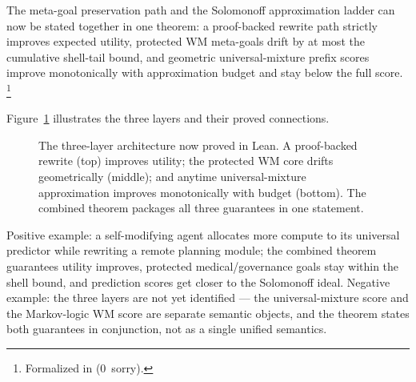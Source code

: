 \documentclass[11pt,openany]{report}
\begin{document}
The meta-goal preservation path and the Solomonoff approximation ladder
can now be stated together in one theorem: a proof-backed rewrite path
strictly improves expected utility, protected WM meta-goals drift by at most
the cumulative shell-tail bound, and geometric universal-mixture prefix scores
improve monotonically with approximation budget and stay below the full
score.%
\footnote{Formalized in
(0~sorry).}

\noindent
Figure~\ref{fig:three-layer} illustrates the three layers and their proved
connections.

\begin{figure}[ht]
\centering
{}
\caption{The three-layer architecture now proved in Lean.  A proof-backed
  rewrite (top) improves utility; the protected WM core drifts
  geometrically (middle); and anytime universal-mixture approximation
  improves monotonically with budget (bottom).  The combined theorem
  packages all three guarantees in one statement.}
\label{fig:three-layer}
\end{figure}

\noindent
Positive example: a self-modifying agent allocates more compute to its
universal predictor while rewriting a remote planning module; the combined
theorem guarantees utility improves, protected medical/governance goals stay
within the shell bound, and prediction scores get closer to the Solomonoff
ideal.
Negative example: the three layers are not yet identified --- the
universal-mixture score and the Markov-logic WM score are separate semantic
objects, and the theorem states both guarantees in conjunction, not as a
single unified semantics.
\end{document}
